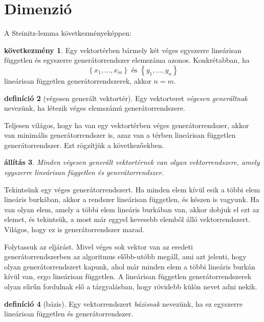 \documentclass[9pt, showtrims]{memoir}
\makeatletter
\renewenvironment{proof}[1][\proofname]
    {\par\pushQED{\qed}%
    \normalfont \topsep6\p@\@plus6\p@\relax
    \trivlist
    \item[\hskip\labelsep
        \itshape
    #1\@addpunct{:}]\ignorespaces}
    {\popQED\endtrivlist\@endpefalse}
\theoremstyle{plain}
\newtheorem{proposition}{állítás}[section]
\theoremstyle{remark}
\theoremstyle{definition}
\newtheorem{definition}[proposition]{definíció}
\newtheorem{corollary}[proposition]{következmény}
\makeatother
\begin{document}
\section{Dimenzió}
A Steinitz-lemma következményeképpen:
\begin{corollary}
    Egy vektortérben bármely két véges egyszerre lineárisan független és egyszerre generátorrendszer elemszáma azonos.
    Konkrétabban, ha
    \[
        \left\{ x_1,\dots,x_m \right\} \text{ és } \left\{ y_1,\dots,y_n \right\}
    \]
    lineárisan független generátorrendszerek, akkor $n=m$.
    \label{co:baziselemszam}
\end{corollary}
\begin{definition}[végesen generált vektortér]
    Egy vektorteret \emph{végesen generáltnak} nevezünk,
    ha létezik véges elemszámú generátorrendszere.
\end{definition}
Teljesen világos, hogy ha van egy vektortérben véges generátorrendszer,
akkor van minimális generátorrendszer is, azaz van a térben lineárisan független generátorrendszer.
Ezt rögzítjük a következőekben.
\begin{proposition}
    Minden végesen generált vektortérnek van olyan vektorrendszere, 
    amely egyszerre lineárisan független és generátorrendszer.
    \label{pr:bazisletezik}
\end{proposition}
\begin{proof}
    Tekintsünk egy véges generátorrendszert.
    Ha minden elem kívül esik a többi elem lineáris burkában, akkor a rendszer lineárisan független, és készen is vagyunk.
    Ha van olyan elem, amely a többi elem lineáris burkában van, akkor dobjuk el ezt az elemet, és tekintsük, a most már
    eggyel kevesebb elemből álló vektorrendszert. 
    Világos, hogy ez is generátorrendszer marad.

    Folytassuk az eljárást.
    Mivel véges sok vektor van az eredeti generátorrendszerben az algoritmus előbb-utóbb megáll,
    ami azt jelenti, hogy olyan generátorrendszert kapunk, 
    ahol már minden elem a többi lineáris burkán kívül van,
    ergo lineárisan független.
\end{proof}
A lineárisan független generátorrendszerek olyan sűrűn fordulnak elő a tárgyalásban,
hogy rövidebb külön nevet adni nekik.
\begin{definition}[bázis]
    Egy vektorrendszert \emph{bázisnak} nevezünk, ha ez egyszerre lineárisan független és generátorrendszer.
\end{definition}
\end{document}
